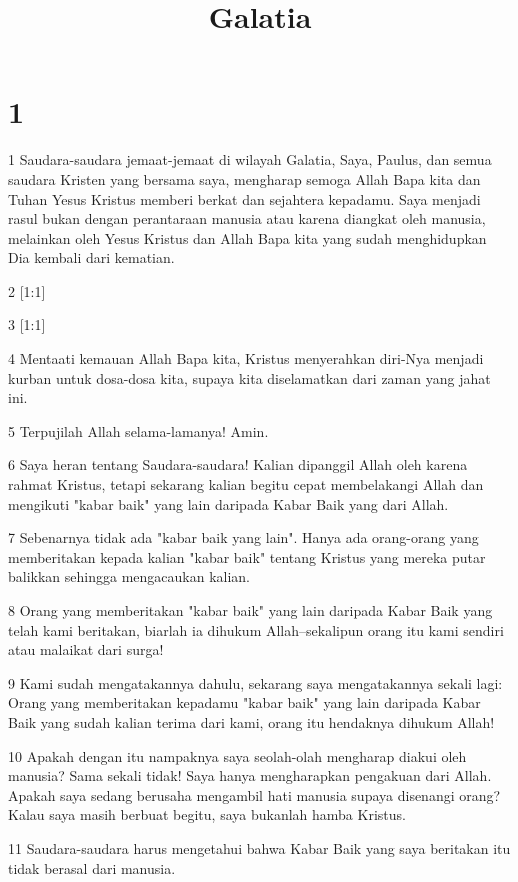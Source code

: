 

\title{Galatia}


\chapter{1}

\par 1 Saudara-saudara jemaat-jemaat di wilayah Galatia, Saya, Paulus, dan semua saudara Kristen yang bersama saya, mengharap semoga Allah Bapa kita dan Tuhan Yesus Kristus memberi berkat dan sejahtera kepadamu. Saya menjadi rasul bukan dengan perantaraan manusia atau karena diangkat oleh manusia, melainkan oleh Yesus Kristus dan Allah Bapa kita yang sudah menghidupkan Dia kembali dari kematian.
\par 2 [1:1]
\par 3 [1:1]
\par 4 Mentaati kemauan Allah Bapa kita, Kristus menyerahkan diri-Nya menjadi kurban untuk dosa-dosa kita, supaya kita diselamatkan dari zaman yang jahat ini.
\par 5 Terpujilah Allah selama-lamanya! Amin.
\par 6 Saya heran tentang Saudara-saudara! Kalian dipanggil Allah oleh karena rahmat Kristus, tetapi sekarang kalian begitu cepat membelakangi Allah dan mengikuti "kabar baik" yang lain daripada Kabar Baik yang dari Allah.
\par 7 Sebenarnya tidak ada "kabar baik yang lain". Hanya ada orang-orang yang memberitakan kepada kalian "kabar baik" tentang Kristus yang mereka putar balikkan sehingga mengacaukan kalian.
\par 8 Orang yang memberitakan "kabar baik" yang lain daripada Kabar Baik yang telah kami beritakan, biarlah ia dihukum Allah--sekalipun orang itu kami sendiri atau malaikat dari surga!
\par 9 Kami sudah mengatakannya dahulu, sekarang saya mengatakannya sekali lagi: Orang yang memberitakan kepadamu "kabar baik" yang lain daripada Kabar Baik yang sudah kalian terima dari kami, orang itu hendaknya dihukum Allah!
\par 10 Apakah dengan itu nampaknya saya seolah-olah mengharap diakui oleh manusia? Sama sekali tidak! Saya hanya mengharapkan pengakuan dari Allah. Apakah saya sedang berusaha mengambil hati manusia supaya disenangi orang? Kalau saya masih berbuat begitu, saya bukanlah hamba Kristus.
\par 11 Saudara-saudara harus mengetahui bahwa Kabar Baik yang saya beritakan itu tidak berasal dari manusia.
